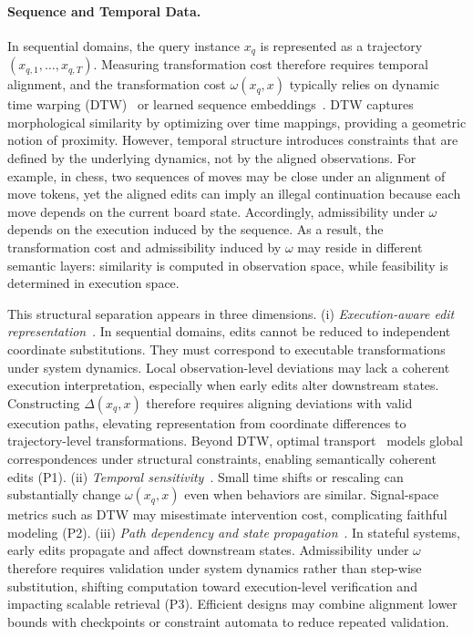\paragraph{Sequence and Temporal Data.}
In sequential domains, the query instance $x_q$ is represented as a trajectory $(x_{q,1},\dots,x_{q,T})$. Measuring transformation cost therefore requires temporal alignment, and the transformation cost $\omega(x_q,x)$ typically relies on dynamic time warping (DTW)~\cite{senin2008dynamic} or learned sequence embeddings~\cite{nalmpantis2019signal2vec}. DTW captures morphological similarity by optimizing over time mappings, providing a geometric notion of proximity. However, temporal structure introduces constraints that are defined by the underlying dynamics, not by the aligned observations. For example, in chess, two sequences of moves may be close under an alignment of move tokens, yet the aligned edits can imply an illegal continuation because each move depends on the current board state. Accordingly, admissibility under $\omega$ depends on the execution induced by the sequence. As a result, the transformation cost and admissibility induced by $\omega$ may reside in different semantic layers: similarity is computed in observation space, while feasibility is determined in execution space.

This structural separation appears in three dimensions. (i) \emph{Execution-aware edit representation}~\cite{jing2024towards}. In sequential domains, edits cannot be reduced to independent coordinate substitutions. They must correspond to executable transformations under system dynamics. Local observation-level deviations may lack a coherent execution interpretation, especially when early edits alter downstream states. Constructing $\Delta(x_q,x)$ therefore requires aligning deviations with valid execution paths, elevating representation from coordinate differences to trajectory-level transformations. Beyond DTW, optimal transport~\cite{charpentier2023optimal} models global correspondences under structural constraints, enabling semantically coherent edits (P1). (ii) \emph{Temporal sensitivity}~\cite{rajput2024evaluating}. Small time shifts or rescaling can substantially change $\omega(x_q,x)$ even when behaviors are similar. Signal-space metrics such as DTW may misestimate intervention cost, complicating faithful modeling (P2). (iii) \emph{Path dependency and state propagation}~\cite{page2006path}. In stateful systems, early edits propagate and affect downstream states. Admissibility under $\omega$ therefore requires validation under system dynamics rather than step-wise substitution, shifting computation toward execution-level verification and impacting scalable retrieval (P3). Efficient designs may combine alignment lower bounds with checkpoints or constraint automata to reduce repeated validation.

